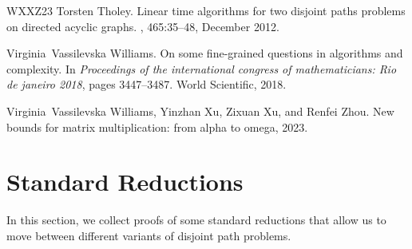 \documentclass[11pt]{article}
\theoremstyle{definition}
\begin{document}
\begin{thebibliography}{WXXZ23}
Torsten Tholey.
\newblock Linear time algorithms for two disjoint paths problems on directed
  acyclic graphs.
, 465:35--48, December 2012.

Virginia~Vassilevska Williams.
\newblock On some fine-grained questions in algorithms and complexity.
\newblock In {\em Proceedings of the international congress of mathematicians:
  Rio de janeiro 2018}, pages 3447--3487. World Scientific, 2018.

Virginia~Vassilevska Williams, Yinzhan Xu, Zixuan Xu, and Renfei Zhou.
\newblock New bounds for matrix multiplication: from alpha to omega, 2023.

\end{thebibliography}

\newpage


\appendix 


\section{Standard Reductions}
\label{app:unnecessary}

In this section, we collect proofs of some standard reductions that allow us to move between different variants of disjoint path problems.
\end{document}
